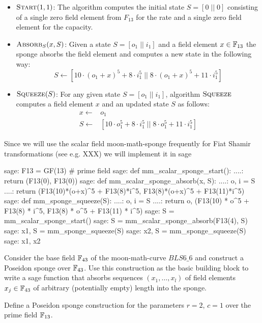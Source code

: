 \begin{itemize}
\label{bls-6-scalar-sponge}
\item $\textsc{Start}(1,1)$: The algorithm computes the initial state $S=[0\;||\;0]$  consisting of a single zero field element from $F_{13}$ for the rate and a single zero field element for the capacity.
\item $\textsc{Absorb}_S(x,S)$: Given a state $S=[o_1\;||\;i_1]$ and a field element $x\in \mathbb{F}_{13}$ the sponge absorbs the field element and computes a new state in the following way:
$$
S \leftarrow [10\cdot (o_1+x)^5 + 8\cdot i_1^5 \;||\; 8\cdot (o_1+x)^5 + 11\cdot i_1^5]
$$
\item $\textsc{Squeeze}(S)$: For any given state $S=[o_1\;||\;i_1]$, algorithm $\textsc{Squeeze}$ computes a field element $x$ and an updated state $S$ as follows:
\begin{align*}
x \leftarrow & o_1 \\
S \leftarrow & [10\cdot o_1^5 + 8\cdot i_1^5 \;||\; 8\cdot o_1^5 + 11\cdot i_1^5]
\end{align*} 
\end{itemize}
Since we will use the scalar field moon-math-sponge frequently for Fiat Shamir transformations (see e.g. XXX) we will implement it in sage
\begin{sagecommandline}
sage: F13 = GF(13) # prime field
sage: def mm_scalar_sponge_start():
....:     return (F13(0), F13(0))
sage: def mm_scalar_sponge_absorb(x, S):
....:     o, i = S
....:     return (F13(10)*(o+x)^5 + F13(8)*i^5, F13(8)*(o+x)^5 + F13(11)*i^5)
sage: def mm_sponge_squeeze(S):
....:     o, i = S
....:     return o, (F13(10) * o^5 + F13(8) * i^5, F13(8) * o^5 + F13(11) * i^5)
sage: S = mm_scalar_sponge_start()
sage: S = mm_scalar_sponge_absorb(F13(4), S)
sage: x1, S = mm_sponge_squeeze(S)
sage: x2, S = mm_sponge_squeeze(S)
sage: x1, x2
\end{sagecommandline}
\begin{exercise}
Consider the base field $\mathbb{F}_{43}$ of the moon-math-curve $BLS6\_6$ and construct a Poseidon sponge over $\mathbb{F}_{43}$. Use this construction as the basic building block to write a sage function that absorbs sequences $(x_1,\ldots,x_l)$ of field elements $x_j\in \mathbb{F}_{43}$ of arbitrary (potentially empty) length into the sponge.
\end{exercise}
\begin{exercise}\label{exercise-wider-f13-sponge}
Define a Poseidon sponge construction for the parameters $r=2$, $c=1$ over the prime field $\mathbb{F}_{13}$.
\end{exercise}

